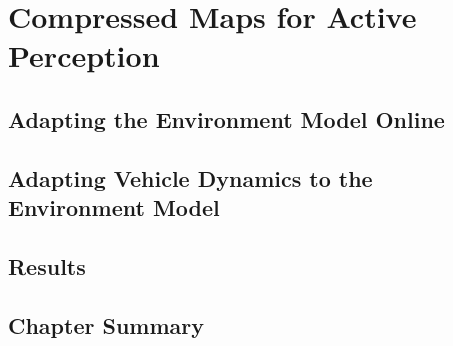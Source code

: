 \chapter{Compressed Maps for Active Perception}

\section{Adapting the Environment Model Online}

\section{Adapting Vehicle Dynamics to the Environment Model}

\section{Results}

\section{Chapter Summary}
